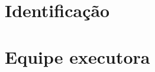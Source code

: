 \documentclass[a4paper,11pt,openany,brazilian,version=last,draft=false]{article}
\begin{document}


\tableofcontents

\newpage%
\section{Identificação}



\newpage%
\section{Equipe executora}









\fim

\end{document}
